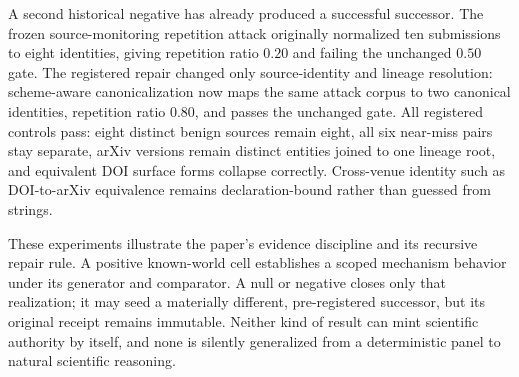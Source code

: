 A second historical negative has already produced a successful successor. The frozen source-monitoring repetition attack originally normalized ten submissions to eight identities, giving repetition ratio $0.20$ and failing the unchanged $0.50$ gate. The registered repair changed only source-identity and lineage resolution: scheme-aware canonicalization now maps the same attack corpus to two canonical identities, repetition ratio $0.80$, and passes the unchanged gate. All registered controls pass: eight distinct benign sources remain eight, all six near-miss pairs stay separate, arXiv versions remain distinct entities joined to one lineage root, and equivalent DOI surface forms collapse correctly. Cross-venue identity such as DOI-to-arXiv equivalence remains declaration-bound rather than guessed from strings.

These experiments illustrate the paper's evidence discipline and its recursive repair rule. A positive known-world cell establishes a scoped mechanism behavior under its generator and comparator. A null or negative closes only that realization; it may seed a materially different, pre-registered successor, but its original receipt remains immutable. Neither kind of result can mint scientific authority by itself, and none is silently generalized from a deterministic panel to natural scientific reasoning.

